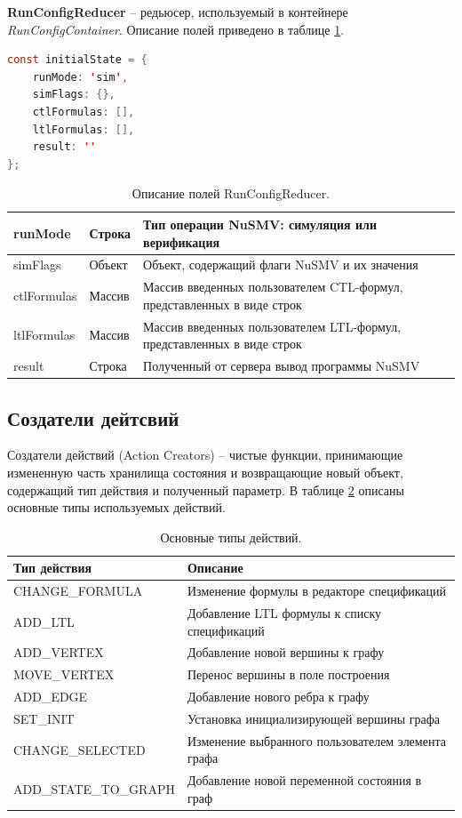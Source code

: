 \textbf{RunConfigReducer} -- редьюсер, используемый в контейнере \textit{RunConfigContainer}. Описание полей приведено в таблице \ref{tab:run_config}.

\begin{lstlisting}[language=Java,
caption={Инициализация состояния RunConfigReducer.}]
const initialState = {
	runMode: 'sim',
	simFlags: {},
	ctlFormulas: [],
	ltlFormulas: [],
	result: ''
};
\end{lstlisting}

\begin{table}[ht]
	\caption{Описание полей RunConfigReducer.}\label{tab:run_config}
	\centering
	\begin{tabular}{|m{2.5 cm}|m{1.5 cm}|m{5 cm}|}
		\hline
		runMode & Строка & Тип операции NuSMV: симуляция или верификация \\
		\hline
		simFlags & Объект & Объект, содержащий флаги NuSMV и их значения \\
		\hline
		ctlFormulas & Массив & Массив введенных пользователем CTL-формул, представленных в виде строк\\
		\hline
		ltlFormulas & Массив & Массив введенных пользователем LTL-формул, представленных в виде строк\\
		\hline
		result & Строка & Полученный от сервера вывод программы NuSMV\\
		\hline
	\end{tabular}
\end{table}

\subsection{Создатели дейтсвий}

Создатели действий (Action Creators) -- чистые функции, принимающие измененную часть хранилища состояния и возвращающие новый объект, содержащий тип действия и полученный параметр. В таблице \ref{tab:actions} описаны основные типы используемых действий.

\begin{table}[ht]
	\caption{Основные типы действий.}\label{tab:actions}
	\centering
	\begin{tabular}{|m{4.5 cm}|m{5.5 cm}|}
		\hline
		Тип действия & Описание \\
		\hline
		CHANGE\_FORMULA & Изменение формулы в редакторе спецификаций \\
		\hline
		ADD\_LTL& Добавление LTL формулы к списку спецификаций  \\
		\hline
		ADD\_VERTEX& Добавление новой вершины к графу \\
		\hline
		MOVE\_VERTEX& Перенос вершины в поле построения \\
		\hline
		ADD\_EDGE& Добавление нового ребра к графу \\
		\hline
		SET\_INIT& Установка инициализирующей вершины графа \\
		\hline
		CHANGE\_SELECTED& Изменение выбранного пользователем элемента графа \\
		\hline
		ADD\_STATE\_TO\_GRAPH& Добавление новой переменной состояния в граф \\
		\hline
	\end{tabular}
\end{table}

